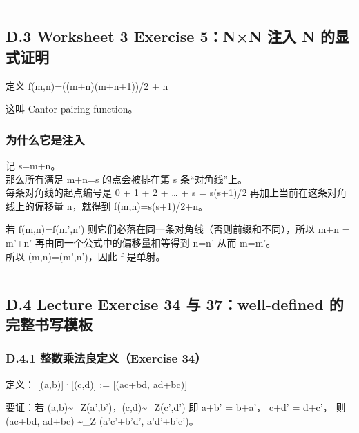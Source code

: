 \documentclass[
  11pt,
]{article}
\begin{document}
\begin{center}\rule{0.5\linewidth}{0.5pt}\end{center}

\subsection{D.3 Worksheet 3 Exercise 5：N×N 注入 N
的显式证明}\label{d.3-worksheet-3-exercise-5nn-ux6ce8ux5165-n-ux7684ux663eux5f0fux8bc1ux660e}

定义 f(m,n)=((m+n)(m+n+1))/2 + n

这叫 Cantor pairing function。

\subsubsection{为什么它是注入}\label{ux4e3aux4ec0ux4e48ux5b83ux662fux6ce8ux5165}

记 s=m+n。\\
那么所有满足 m+n=s 的点会被排在第 s 条``对角线''上。\\
每条对角线的起点编号是 0 + 1 + 2 + \ldots{} + s = s(s+1)/2
再加上当前在这条对角线上的偏移量 n，就得到 f(m,n)=s(s+1)/2+n。

若 f(m,n)=f(m',n') 则它们必落在同一条对角线（否则前缀和不同），所以 m+n
= m'+n' 再由同一个公式中的偏移量相等得到 n=n' 从而 m=m'。\\
所以 (m,n)=(m',n')，因此 f 是单射。

\begin{center}\rule{0.5\linewidth}{0.5pt}\end{center}

\subsection{D.4 Lecture Exercise 34 与 37：well-defined
的完整书写模板}\label{d.4-lecture-exercise-34-ux4e0e-37well-defined-ux7684ux5b8cux6574ux4e66ux5199ux6a21ux677f}

\subsubsection{D.4.1 整数乘法良定义（Exercise
34）}\label{d.4.1-ux6574ux6570ux4e58ux6cd5ux826fux5b9aux4e49exercise-34}

定义： {[}(a,b){]}·{[}(c,d){]} := {[}(ac+bd, ad+bc){]}

要证：若 (a,b)\textasciitilde\_Z(a',b')，(c,d)\textasciitilde\_Z(c',d')
即 a+b' = b+a'， c+d' = d+c'， 则 (ac+bd, ad+bc) \textasciitilde\_Z
(a'c'+b'd', a'd'+b'c')。
\end{document}

